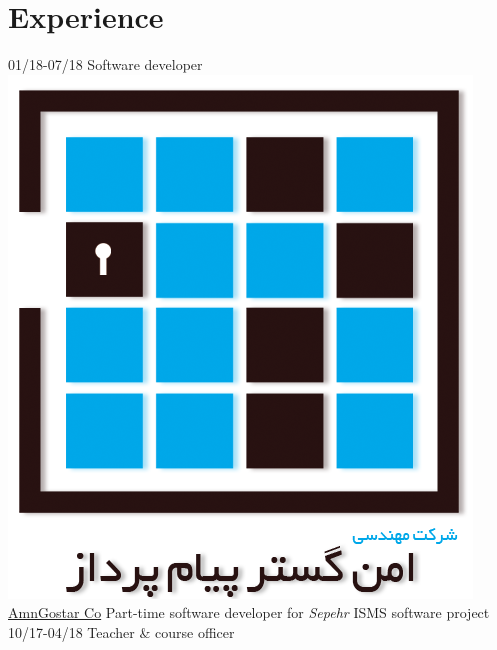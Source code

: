 \documentclass[a4paper]{friggeri-cv}
\begin{document}
    \section{Experience}\label{sec:experience}
    \begin{entrylist}
        \entry
        {01/18-07/18}
        {    Software developer}
        {\href{http://www.amngostar-co.com/}{\includegraphics[scale=0.04]{../assets/images/logos/AmnGostar_logo.png} AmnGostar Co}}
        {Part-time software developer for \emph{Sepehr} ISMS software project}
        \entry
        {10/17-04/18}
        {    Teacher \& course officer}

\end{entrylist}
\end{document}
